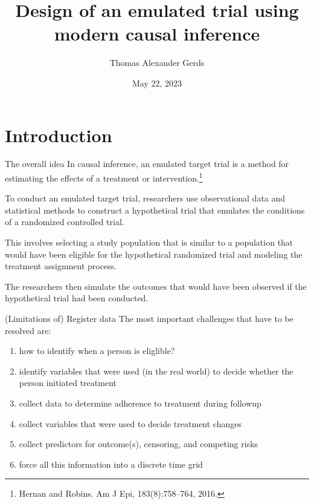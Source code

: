 \documentclass{beamer}\usepackage{listings}
\institute{Section of Biostatistics, University of Copenhagen}
\subtitle{}
\author{Thomas Alexander Gerds}
\date{May 22, 2023}
\title{Design of an emulated trial using modern causal inference}
\begin{document}
\maketitle

\section{Introduction}
\label{sec:org4c9867f}

\begin{frame}[label={sec:org0abe3ef}]{The overall idea}
In causal inference, an emulated target trial is a
method for estimating the effects of a treatment or
intervention.\footnote{Hernan and Robins. Am J Epi, 183(8):758--764, 2016.} \vfill

To conduct an emulated target trial, researchers use observational
data and statistical methods to construct a hypothetical trial that
emulates the conditions of a randomized controlled trial. 
\vfill

This involves selecting a study population that is similar to a
population that would have been eligible for the hypothetical
randomized trial and modeling the treatment assignment process.
\vfill

The researchers then simulate the outcomes that would have been
observed if the hypothetical trial had been conducted.
\end{frame}

\begin{frame}[label={sec:orgffc08de}]{(Limitations of) Register data}
The most important challenges that have to be resolved are:
\vfill

\begin{enumerate}
\item how to identify \alert{when} a person is eliglible?
\item identify variables that were used (in the real world) to decide whether the person initiated treatment
\item collect data to determine adherence to treatment during followup
\item collect variables that were used to decide treatment changes
\item collect predictors for outcome(s), censoring, and competing risks
\item force all this information into a \alert{discrete time grid}
\end{enumerate}
\end{frame}
\end{document}
